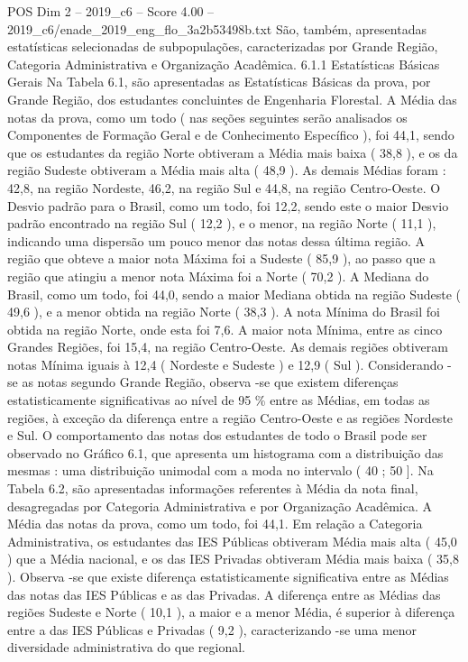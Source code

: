 \begin{textsample}{POS Dim 2 – 2019\_c6 – Score 4.00 – 2019\_c6/enade\_2019\_eng\_flo\_3a2b53498b.txt}
São, também, apresentadas estatísticas selecionadas de subpopulações, caracterizadas por Grande Região, Categoria Administrativa e Organização Acadêmica. 6.1.1 Estatísticas Básicas Gerais Na Tabela 6.1, são apresentadas as Estatísticas Básicas da prova, por Grande Região, dos estudantes concluintes de Engenharia Florestal.
A Média das notas da prova, como um todo ( nas seções seguintes serão analisados os Componentes de Formação Geral e de Conhecimento Específico ), foi 44,1, sendo que os estudantes da região Norte obtiveram a Média mais baixa ( 38,8 ), e os da região Sudeste obtiveram a Média mais alta ( 48,9 ).
As demais Médias foram : 42,8, na região Nordeste, 46,2, na região Sul e 44,8, na região Centro-Oeste.
O Desvio padrão para o Brasil, como um todo, foi 12,2, sendo este o maior Desvio padrão encontrado na região Sul ( 12,2 ), e o menor, na região Norte ( 11,1 ), indicando uma dispersão um pouco menor das notas dessa última região.
A região que obteve a maior nota Máxima foi a Sudeste ( 85,9 ), ao passo que a região que atingiu a menor nota Máxima foi a Norte ( 70,2 ).
A Mediana do Brasil, como um todo, foi 44,0, sendo a maior Mediana obtida na região Sudeste ( 49,6 ), e a menor obtida na região Norte ( 38,3 ).
A nota Mínima do Brasil foi obtida na região Norte, onde esta foi 7,6.
A maior nota Mínima, entre as cinco Grandes Regiões, foi 15,4, na região Centro-Oeste.
As demais regiões obtiveram notas Mínima iguais à 12,4 ( Nordeste e Sudeste ) e 12,9 ( Sul ).
Considerando -se as notas segundo Grande Região, observa -se que existem diferenças estatisticamente significativas ao nível de 95 \% entre as Médias, em todas as regiões, à exceção da diferença entre a região Centro-Oeste e as regiões Nordeste e Sul.
O comportamento das notas dos estudantes de todo o Brasil pode ser observado no Gráfico 6.1, que apresenta um histograma com a distribuição das mesmas : uma distribuição unimodal com a moda no intervalo ( 40 ; 50 ].
Na Tabela 6.2, são apresentadas informações referentes à Média da nota final, desagregadas por Categoria Administrativa e por Organização Acadêmica.
A Média das notas da prova, como um todo, foi 44,1.
Em relação a Categoria Administrativa, os estudantes das IES Públicas obtiveram Média mais alta ( 45,0 ) que a Média nacional, e os das IES Privadas obtiveram Média mais baixa ( 35,8 ).
Observa -se que existe diferença estatisticamente significativa entre as Médias das notas das IES Públicas e as das Privadas.
A diferença entre as Médias das regiões Sudeste e Norte ( 10,1 ), a maior e a menor Média, é superior à diferença entre a das IES Públicas e Privadas ( 9,2 ), caracterizando -se uma menor diversidade administrativa do que regional.

\end{textsample}

